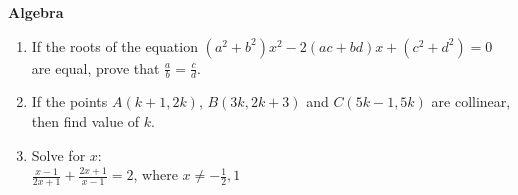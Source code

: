 \documentclass{article}                                                                                                                                   \usepackage{graphicx}
\begin{document}
\begin{center}
\textbf{Algebra}
\end{center}                                                                                                                                              \begin{enumerate}                                                                                                                                         \item If the roots of the equation $(a^2 + b^2) x^2 - 2(ac+bd)x + (c^2 + d^2)=0$ are equal, prove that $\frac{a}{b} = \frac{c}{d}$.\\                     \item If the points $A(k+1,2k)$, $B(3k,2k+3)$ and $C(5k-1,5k)$ are collinear, then find value of $k$.                                                                                                                                                                                                               \item Solve for $x$:\\                                                                                                                                                                    $\frac{x-1}{2x+1} + \frac{2x+1}{x-1} = 2$,
                where $x \neq - \frac{1}{2},1$                                                                                                                            \end{enumerate}
\end{document}
